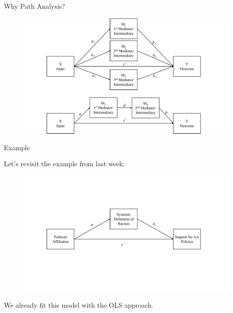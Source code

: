 \documentclass{beamer}
\begin{document}
\begin{frame}{Why Path Analysis?}

  \begin{figure}
    \includegraphics[width=\textwidth]{figures/multipleMediationPathDiagrams.pdf}
  \end{figure}

\end{frame}



\begin{frame}{Example}

  Let's revisit the example from last week:

  \vspace{-12pt}
  
  \begin{figure}
    \includegraphics[width=\textwidth]{figures/adamsKlpsExample1PathDiagram.pdf}
  \end{figure}

  \vspace{-24pt}
  
  We already fit this model with the OLS approach.

\end{frame}
\end{document}
